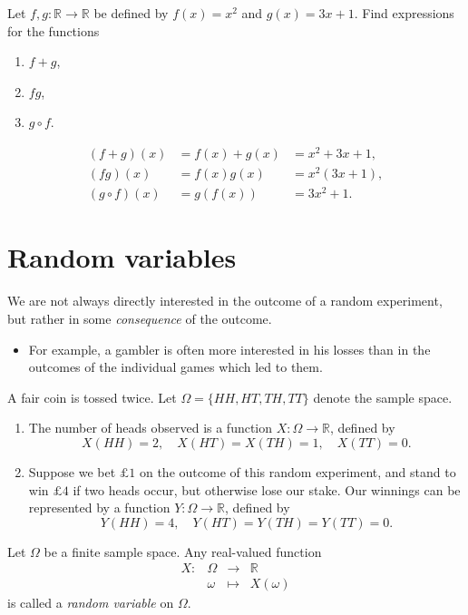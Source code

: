 \documentclass[lecture]{csm}
\newcommand{\R}{\mathbb{R}}
\def\it{\item}
\def\bit{\begin{itemize}}
\def\eit{\end{itemize}}
\def\ben{\begin{enumerate}}
\def\een{\end{enumerate}}
\begin{document}
\newpage

\begin{example}
Let $f,g:\R\to\R$ be defined by $f(x)=x^2$ and $g(x)=3x+1$. Find expressions for the functions 
\ben
\it $f+g$, 
\it $fg$,
\it $g\circ f$.
\een
\begin{solution}
\[\begin{array}{lll}
(f+g)(x) 		& = f(x) + g(x)		& = x^2 + 3x + 1,\\
(fg)(x)			& = f(x)g(x) 		& = x^2(3x+1), \\
(g\circ f)(x)	& = g(f(x))	& = 3x^2 + 1.
\end{array}\]
\end{solution}
\end{example}

\newpage
\section{Random variables}
We are not always directly interested in the outcome of a random experiment, but rather in some \emph{consequence} of the outcome.
\bit
\it For example, a gambler is often more interested in his losses than in the outcomes of the individual games which led to them.
\eit

\begin{example}\label{ex:randomvariables}
A fair coin is tossed twice. Let $\Omega=\{HH,HT,TH,TT\}$ denote the sample space.
\ben
\it The number of heads observed is a function $X:\Omega\to\R$, defined by
\[
X(HH)=2,\quad X(HT) = X(TH) = 1,\quad X(TT)=0.
\]
\it Suppose we bet $\pounds 1$ on the outcome of this random experiment, and stand to win $\pounds 4$ if two heads occur, but otherwise lose our stake. Our winnings can be represented by a function $Y:\Omega\to\R$, defined by 
\[
Y(HH)=4,\quad Y(HT) = Y(TH) = Y(TT) = 0.
\]
\een
\end{example}

\break %

\begin{definition}
Let $\Omega$ be a finite sample space. Any real-valued function 
\[
\begin{array}{rlcl}
X: 	& \Omega & \to  		& \R \\
	& \omega & \mapsto	& X(\omega)
\end{array}
\]	
is called a \emph{random variable} on $\Omega$.
\end{definition}
\end{document}
